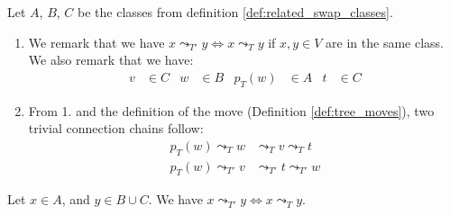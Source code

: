 
\begin{remark}
    \label{rem:related_swap_classes}
    Let $A$, $B$, $C$ be the classes from definition \ref{def:related_swap_classes}. 
    \begin{enumerate}
        \item We remark that we have $x \leadsto_{T'} y \Leftrightarrow x \leadsto_T y$ if $x, y \in V$ are in the same class. We also remark that we have:
        \begin{align*}
            v &\in C & w &\in B & p_T(w) &\in A & t &\in C
        \end{align*}
        \item From 1. and the definition of the move (Definition \ref{def:tree_moves}), two trivial connection chains follow:
        \begin{align*}
            p_T(w) \leadsto_T w &\leadsto_T v \leadsto _T t \\
            p_T(w) \leadsto_{T'} v &\leadsto_{T'} t \leadsto_{T'} w
        \end{align*}
    \end{enumerate}
\end{remark}

\begin{lemma}
    \label{lem:related_swap_abc}
    Let $x \in A$, and $y \in B \cup C$. We have $x \leadsto_{T'} y \Leftrightarrow x \leadsto_T y$.
\end{lemma}

